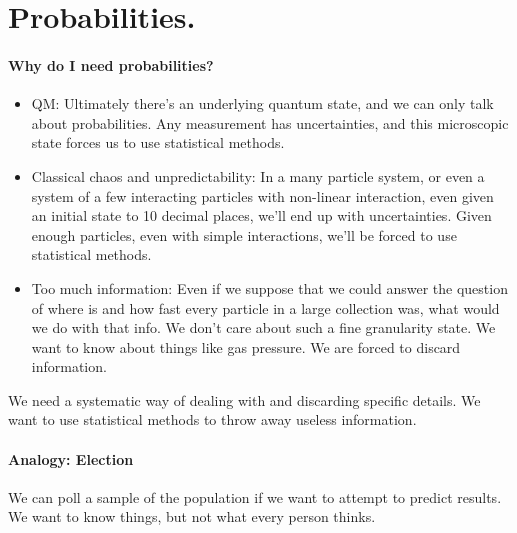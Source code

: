 %
%
\section{Probabilities.}

\paragraph{Why do I need probabilities?}

\begin{itemize}
\item QM: Ultimately there's an underlying quantum state, and we can only talk about probabilities.  Any measurement has uncertainties, and this microscopic state forces us to use statistical methods.
\item Classical chaos and unpredictability: In a many particle system, or even a system of a few interacting particles with non-linear interaction, even given an initial state to 10 decimal places, we'll end up with uncertainties.  Given enough particles, even with simple interactions, we'll be forced to use statistical methods.
\item Too much information: Even if we suppose that we could answer the question of where is and how fast every particle in a large collection was, what would we do with that info.  We don't care about such a fine granularity state.  We want to know about things like gas pressure.  We are forced to discard information.
\end{itemize}

We need a systematic way of dealing with and discarding specific details.  We want to use statistical methods to throw away useless information.

\paragraph{Analogy: Election}

We can poll a sample of the population if we want to attempt to predict results.  We want to know things, but not what every person thinks.

